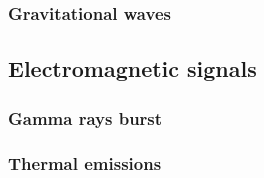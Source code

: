 \subsubsection{Gravitational waves}
\subsection{Electromagnetic signals}
\subsubsection{Gamma rays burst}
\subsubsection{Thermal emissions}




%

